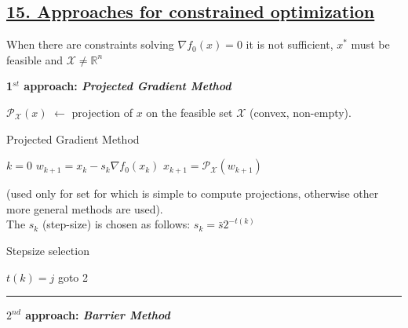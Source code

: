 \documentclass[a4paper]{article}
\begin{document}
\subsection*{\underline{15. Approaches for constrained optimization}}
\begin{center}
    \textsf{When there are constraints solving $\nabla{f_0(x)}=0$ it is not sufficient, $x^*$ must be feasible and $\mathcal{X}\ne\mathbb{R}^n$}
\end{center}
\vspace{-0.2cm}
\textbf{1$^{st}$ approach: \textit{Projected Gradient Method}}
\vspace{-0.3cm}
\begin{multicols}{2}
    \noindent
    $\mathcal{P}_\mathcal{X}(x)$ $\leftarrow$ projection of $x$ on the feasible set $\mathcal{X}$ (convex, non-empty). 
    \vspace{-0.3cm}
    \begin{algorithm}[H]
        \caption{Projected Gradient Method}
        \begin{algorithmic}[1]
            \State $k=0$
            \State $w_{k+1}=x_{k}-s_k\nabla{f_0(x_k)}$  
            \State $x_{k+1}=\mathcal{P}_\mathcal{X}(w_{k+1})$ 
        \end{algorithmic}
    \end{algorithm}
    \vspace{-0.5cm}
    \noindent
    (used only for set for which is simple to compute projections, otherwise other more general methods are used).
    \newcolumn\\
    The $s_k$ (step-size) is chosen as follows: $s_k=\bar{s}2^{-t(k)}$
    \vspace{-0.3cm}
    \begin{algorithm}[H]
        \caption{Stepsize selection}
        \begin{algorithmic}[1]
                \State $t(k)=j$
            \Else
                \State goto 2
            \EndIf
        \end{algorithmic}
    \end{algorithm}
    \noindent
\end{multicols}
\vspace{-0.2cm}
\hrule
\noindent
\textbf{$2^{nd}$ approach: \textit{Barrier Method}}
\vspace{-0.4cm}
\end{document}
